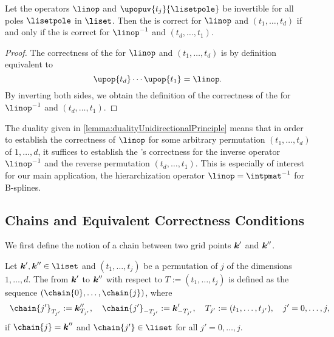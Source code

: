 \begin{lemma}
  \label{lemma:dualityUnidirectionalPrinciple}
  Let the operators $\linop$ and $\upopuv{t_j}{\lisetpole}$ be invertible
  for all poles $\lisetpole$ in $\liset$.
  Then the \up is correct for $\linop$ and $(t_1, \dotsc, t_d)$
  if and only if the \up is correct for $\linopinv$ and $(t_d, \dotsc, t_1)$.
\end{lemma}

\begin{proof}
  The correctness of the \up for $\linop$ and $(t_1, \dotsc, t_d)$
  is by definition equivalent to
  \begin{equation}
    \upop{t_d} \dotsm \upop{t_1} = \linop.
  \end{equation}
  By inverting both sides, we obtain the definition of the
  correctness of the \up for $\linopinv$ and $(t_d, \dotsc, t_1)$.
\end{proof}

The duality given in \cref{lemma:dualityUnidirectionalPrinciple}
means that in order to establish the correctness of $\linop$
for some arbitrary permutation $(t_1, \dotsc, t_d)$ of $1, \dotsc, d$,
it suffices to establish the \up's correctness for the
inverse operator $\linopinv$ and the reverse permutation $(t_d, \dotsc, t_1)$.
This is especially of interest for our main application,
the hierarchization operator $\linop = \intpmatinv$ for B-splines.



\subsection{Chains and Equivalent Correctness Conditions}
\label{sec:453chains}

We first define the notion of a chain between two grid points
${\boldsymbol{k}}'$ and ${\boldsymbol{k}}''$.

\begin{definition}[chain]
  \label{def:chain}
  Let $\*k', \*k'' \in \liset$ and
  $(t_1, \dotsc, t_j)$ be a permutation of $j$ of the
  dimensions $1, \dotsc, d$.
  The  from ${\boldsymbol{k}}'$ to ${\boldsymbol{k}}''$ with respect to
  $T := (t_1, \dotsc, t_j)$ is defined as the sequence
  $(\chain{0}, \dotsc, \chain{j})$, where
  \begin{equation}
    \chain{j'}_{T_{j'}}
    := \*k''_{T_{j'}},\quad
    \chain{j'}_{-T_{j'}}
    := \*k'_{-T_{j'}},\quad
    T_{j'}
    := (t_1, \dotsc, t_{j'}),\quad
    j' = 0, \dotsc, j,
    \hspace*{-10mm}
  \end{equation}
  if $\chain{j} = \*k''$ and
  $\chain{j'} \in \liset$ for all $j' = 0, \dotsc, j$.
\end{definition}


